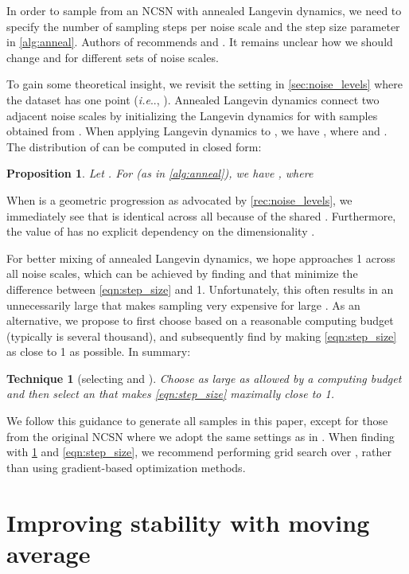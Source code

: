 \documentclass{article}
\makeatletter
\newtheorem{recipe}{Technique}
\newtheorem{proposition}{Proposition}
\def\@onedot{\ifx\@let@token.\else.\null\fi\xspace}
\DeclareRobustCommand\onedot{\futurelet\@let@token\@onedot}
\def\ie{\emph{i.e}\onedot}
\makeatother
\begin{document}
In order to sample from an NCSN with annealed Langevin dynamics, we need to specify the number of sampling steps per noise scale  and the step size parameter  in \cref{alg:anneal}. Authors of \cite{song2019generative} recommends  and . It remains unclear how we should change  and  for different sets of noise scales. 

To gain some theoretical insight, we revisit the setting in \cref{sec:noise_levels} where the dataset has one point (\ie, ). Annealed Langevin dynamics connect two adjacent noise scales  by initializing the Langevin dynamics for  with samples obtained from . When applying Langevin dynamics to , we have , where  and . The distribution of  can be computed in closed form:
\begin{proposition}\label{prop:langevin}
Let . For  (as in \cref{alg:anneal}), we have , where

\end{proposition}
When  is a geometric progression as advocated by \cref{rec:noise_levels}, we immediately see that  is identical across all  because of the shared . Furthermore, the value of  has no explicit dependency on the dimensionality . 

For better mixing of annealed Langevin dynamics, we hope  
approaches 1 across all noise scales, which can be achieved by finding  and  that minimize the difference between \cref{eqn:step_size} and 1. Unfortunately, this often results in an unnecessarily large  that makes sampling very expensive for large . As an alternative, we propose to first choose  based on a reasonable computing budget (typically  is several thousand), and subsequently find  by making \cref{eqn:step_size} as close to 1 as possible.
In summary:
\begin{recipe}[selecting  and ]\label{rec:langevin}
    Choose  as large as allowed by a computing budget and then select an  that makes \cref{eqn:step_size} maximally close to 1.
\end{recipe}
We follow this guidance to generate all samples in this paper, except for those from the original NCSN where we adopt the same settings as in \cite{song2019generative}. When finding  with \cref{rec:langevin} and \cref{eqn:step_size}, we recommend performing grid search over , rather than using gradient-based optimization methods.


 \section{Improving stability with moving average}\label{sec:stability}
\end{document}
